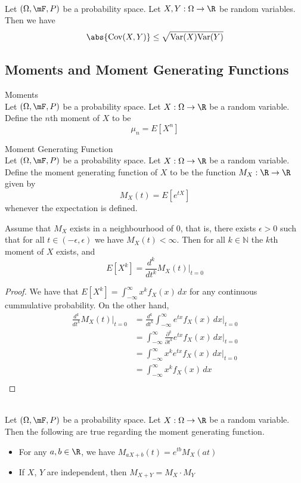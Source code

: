 \documentclass[a4paper]{article}
\begin{document}
\begin{prp}{}{}\\
Let $(\Omega,\mF,P)$ be a probability space. Let $X,Y:\Omega\to\R$ be random variables. Then we have $$\abs{\text{Cov}(X,Y)}\leq\sqrt{\text{Var}(X)\text{Var}(Y)}$$
\end{prp}

\subsection{Moments and Moment Generating Functions}
\begin{defn}{Moments}{}\\
Let $(\Omega,\mF,P)$ be a probability space. Let $X:\Omega\to\R$ be a random variable. Define the $n$th moment of $X$ to be $$\mu_n=E[X^n]$$
\end{defn}

\begin{defn}{Moment Generating Function}{}\\
Let $(\Omega,\mF,P)$ be a probability space. Let $X:\Omega\to\R$ be a random variable. Define the moment generating function of $X$ to be the function $M_X:\R\to\R$ given by $$M_X(t)=E[e^{tX}]$$ whenever the expectation is defined. 
\end{defn}

\begin{prp}{}{} Assume that $M_X$ exists in a neighbourhood of $0$, that is, there exists $\epsilon>0$ such that for all $t\in(-\epsilon,\epsilon)$ we have $M_X(t)<\infty$. Then for all $k\in\mathbb{N}$ the $k$th moment of $X$ exists, and $$E[X^k]=\frac{d^k}{dt^k}M_X(t)\bigg|_{t=0}$$
\begin{proof} We have that $E[X^k]=\int_{-\infty}^\infty x^kf_X(x)\,dx$ for any continuous cummulative probability. On the other hand, 
\begin{align*}
\frac{d^k}{dt^k}M_X(t)\bigg|_{t=0}&=\frac{d^k}{dt^k}\int_{-\infty}^\infty e^{tx}f_X(x)\,dx\bigg|_{t=0}\\
&=\int_{-\infty}^\infty\frac{\partial^k}{\partial t^k}e^{tx}f_X(x)\,dx\bigg|_{t=0}\\
&=\int_{-\infty}^\infty x^ke^{tx}f_X(x)\,dx\bigg|_{t=0}\\
&=\int_{-\infty}^\infty x^kf_X(x)\,dx\\
\end{align*}
\end{proof}
\end{prp}

\begin{prp}{}{}\\
Let $(\Omega,\mF,P)$ be a probability space. Let $X:\Omega\to\R$ be a random variable. Then the following are true regarding the moment generating function. 
\begin{itemize}
\item For any $a,b\in\R$, we have $M_{aX+b}(t)=e^{tb}M_X(at)$
\item If $X$, $Y$ are independent, then $M_{X+Y}=M_X\cdot M_Y$
\end{itemize}
\end{prp}
\end{document}
